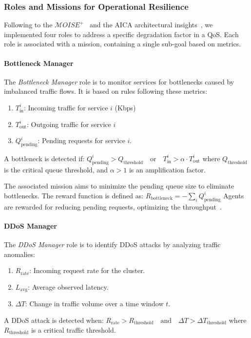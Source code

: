 \subsubsection{Roles and Missions for Operational Resilience}

\noindent Following to the $\mathcal{M}OISE^+$~\cite{hubner2002moise} and the AICA architectural insights~\cite{kott2018autonomous}, we implemented four roles to address a specific degradation factor in a QoS.
Each role is associated with a mission, containing a single sub-goal based on metrics.

\noindent \paragraph{\textbf{Bottleneck Manager}} 
%
The \textit{Bottleneck Manager} role is to monitor services for bottlenecks caused by imbalanced traffic flows. It is based on rules following these metrics:
\begin{enumerate}[label={}, itemjoin={;\quad }]
    \item \( T_{\text{in}}^i \): Incoming traffic for service \( i \) (Kbps)
    \item \( T_{\text{out}}^i \): Outgoing traffic for service \( i \)
    \item \( Q_{\text{pending}}^i \): Pending requests for service \( i \).
\end{enumerate}
A bottleneck is detected if: $Q_{\text{pending}}^i > Q_{\text{threshold}} \quad \text{or} \quad T_{\text{in}}^i > \alpha \cdot T_{\text{out}}^i$
where \( Q_{\text{threshold}} \) is the critical queue threshold, and \( \alpha > 1 \) is an amplification factor.

The associated mission aims to minimize the pending queue size to eliminate bottlenecks. The reward function is defined as: $R_{\text{bottleneck}} = - \sum_{i} Q_{\text{pending}}^i$
Agents are rewarded for reducing pending requests, optimizing the throughput~\cite{burns2016borg}.

\noindent \paragraph{\textbf{DDoS Manager}}

The \textit{DDoS Manager} role is to identify DDoS attacks by analyzing traffic anomalies:
\begin{enumerate}[label={}, itemjoin={;\quad }]
    \item \( R_{\text{rate}} \): Incoming request rate for the cluster.
    \item \( L_{\text{avg}} \): Average observed latency.
    \item \( \Delta T \): Change in traffic volume over a time window \( t \).
\end{enumerate}
A DDoS attack is detected when:
$R_{\text{rate}} > R_{\text{threshold}} \quad \text{and} \quad \Delta T > \Delta T_{\text{threshold}}$
where \( R_{\text{threshold}} \) is a critical traffic threshold.

